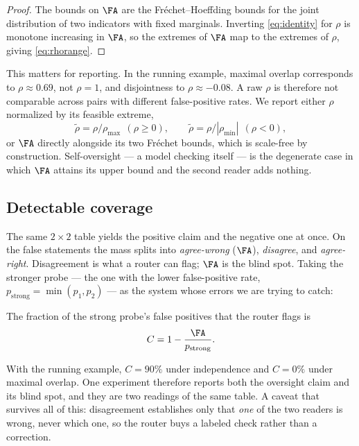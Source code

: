 \begin{proof}
The bounds on $\FA$ are the Fr\'echet--Hoeffding bounds for the joint
distribution of two indicators with fixed marginals. Inverting
\eqref{eq:identity} for $\rho$ is monotone increasing in $\FA$, so the extremes
of $\FA$ map to the extremes of $\rho$, giving \eqref{eq:rhorange}.
\end{proof}

This matters for reporting. In the running example, maximal overlap corresponds
to $\rho \approx 0.69$, not $\rho = 1$, and disjointness to $\rho \approx -0.08$.
A raw $\rho$ is therefore not comparable across pairs with different
false-positive rates. We report either $\rho$ normalized by its feasible extreme,
\begin{equation}
  \tilde\rho = \rho / \rho_{\max} \ \ (\rho \ge 0),
  \qquad
  \tilde\rho = \rho / |\rho_{\min}| \ \ (\rho < 0),
  \label{eq:rhonorm}
\end{equation}
or $\FA$ directly alongside its two Fr\'echet bounds, which is
scale-free by construction. Self-oversight --- a model checking itself --- is the
degenerate case in which $\FA$ attains its upper bound and the second reader adds
nothing.

\subsection{Detectable coverage}
\label{sec:theory:coverage}

The same $2\times 2$ table yields the positive claim and the negative one at
once. On the false statements the mass splits into \emph{agree-wrong} ($\FA$),
\emph{disagree}, and \emph{agree-right}. Disagreement is what a router can flag;
$\FA$ is the blind spot. Taking the stronger probe --- the one with the lower
false-positive rate, $p_{\mathrm{strong}} = \min(p_1,p_2)$ --- as the system
whose errors we are trying to catch:

\begin{corollary}
\label{cor:coverage}
The fraction of the strong probe's false positives that the router flags is
\begin{equation}
  C = 1 - \frac{\FA}{p_{\mathrm{strong}}}.
  \label{eq:coverage}
\end{equation}
\end{corollary}

With the running example, $C = 90\%$ under independence and $C = 0\%$ under
maximal overlap. One experiment therefore reports both the oversight claim and
its blind spot, and they are two readings of the same table. A caveat that
survives all of this: disagreement establishes only that \emph{one} of the two
readers is wrong, never which one, so the router buys a labeled check rather than
a correction.

